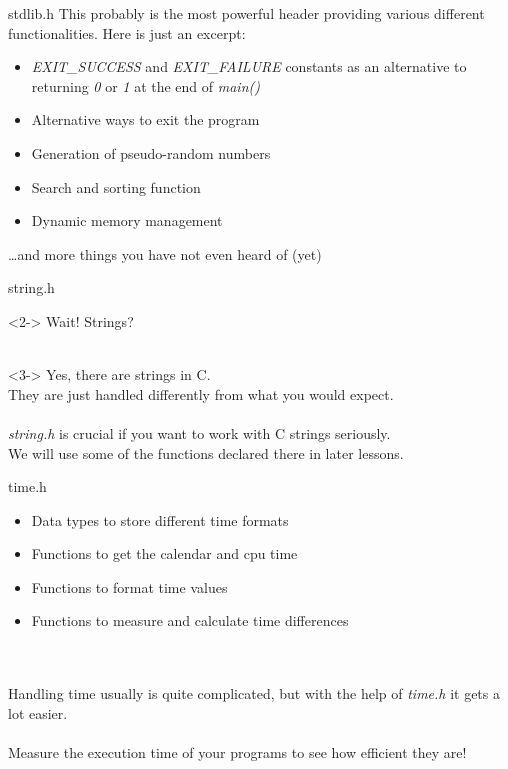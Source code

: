 \begin{frame}{stdlib.h}
	This probably is the most powerful header providing various different functionalities. Here is just an excerpt:
	\begin{itemize}
		\item \textit{EXIT\_SUCCESS} and \textit{EXIT\_FAILURE} constants as an alternative to returning \textit{0} or \textit{1} at the end of \textit{main()}
		\item Alternative ways to exit the program
		\item Generation of pseudo-random numbers
		\item Search and sorting function
		\item Dynamic memory management
	\end{itemize}
		\dots and more things you have not even heard of (yet)
\end{frame}


\begin{frame}{string.h}
	\begin{uncoverenv}<2->
		Wait! Strings? \\ \ \\
	\end{uncoverenv}
	\begin{uncoverenv}<3->
		Yes, there are strings in C. \\
		They are just handled differently from what you would expect. \\ \ \\
		\textit{string.h} is crucial if you want to work with C strings seriously. \\
		We will use some of the functions declared there in later lessons.
	\end{uncoverenv}
\end{frame}


\begin{frame}{time.h}
	\begin{itemize}
		\item Data types to store different time formats
		\item Functions to get the calendar and cpu time
		\item Functions to format time values
		\item Functions to measure and calculate time differences
	\end{itemize} \ \\ \ \\
	Handling time usually is quite complicated, but with the help of \textit{time.h} it gets a lot easier.\\
	\ \\
	Measure the execution time of your programs to see how efficient they are!
\end{frame}

